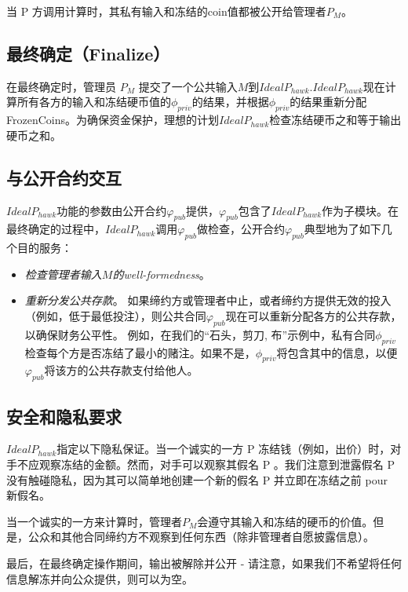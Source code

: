 \documentclass{xduugtrans}
\begin{document}
当 P 方调用计算时，其私有输入和冻结的coin值都被公开给管理者$P_M$。

\subsection{最终确定（Finalize）}

在最终确定时，管理员 $P_M$ 提交了一个公共输入$M$到$IdealP_{hawk}$.$IdealP_{hawk}$现在计算所有各方的输入和冻结硬币值的$\phi  _{priv}$的结果，并根据$\phi  _{priv}$的结果重新分配FrozenCoins。为确保资金保护，理想的计划$IdealP_{hawk}$检查冻结硬币之和等于输出硬币之和。

\subsection{与公开合约交互}

$IdealP_{hawk}$功能的参数由公开合约$\varphi _{pub}$提供，$\varphi _{pub}$包含了$IdealP_{hawk}$作为子模块。在最终确定的过程中，$IdealP_{hawk}$调用$\varphi _{pub}$做检查，公开合约$\varphi _{pub}$典型地为了如下几个目的服务：

\begin{itemize}
    \item \textit{检查管理者输入$M$的well-formedness}。
    \item \textit{重新分发公共存款}。 如果缔约方或管理者中止，或者缔约方提供无效的投入（例如，低于最低投注），则公共合同$\varphi _{pub}$现在可以重新分配各方的公共存款，以确保财务公平性。 例如，在我们的“石头，剪刀, 布”示例中，私有合同$\phi _{priv}$检查每个方是否冻结了最小的赌注。如果不是，$\phi _{priv}$将包含其中的信息，以便$\varphi _{pub}$将该方的公共存款支付给他人。
\end{itemize}

\subsection{安全和隐私要求}

$IdealP_{hawk}$指定以下隐私保证。当一个诚实的一方 P 冻结钱（例如，出价）时，对手不应观察冻结的金额。然而，对手可以观察其假名 P 。我们注意到泄露假名 P 没有触碰隐私，因为其可以简单地创建一个新的假名 P 并立即在冻结之前 pour 新假名。

当一个诚实的一方来计算时，管理者$P_M$会遵守其输入和冻结的硬币的价值。但是，公众和其他合同缔约方不观察到任何东西（除非管理者自愿披露信息）。

最后，在最终确定操作期间，输出被解除并公开 - 请注意，如果我们不希望将任何信息解冻并向公众提供，则可以为空。
\end{document}
